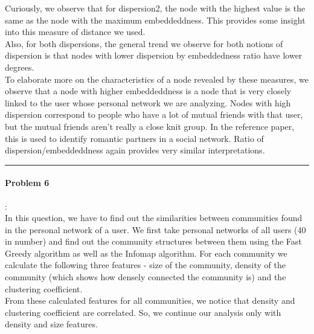 \documentclass{article}
\begin{document}
Curiously, we observe that for dispersion2, the node with the highest value is the same as the node with the maximum embeddeddness.
This provides some insight into this measure of distance we used.\\
Also, for both dispersions, the general trend we observe for both notions of dispersion 
is that nodes with lower dispersion by
embeddedness ratio have lower degrees.\\

To elaborate more on the characteristics of a node revealed by these measures, we observe that a node with higher
embeddeddness is a node that is very closely linked to the user whose personal network we are analyzing.
Nodes with high dispersion correspond to people who have a lot of mutual friends with that user, but the mutual friends
aren't really a close knit group. In the reference paper, this is used to identify romantic partners in a social network.
Ratio of dispersion/embeddeddness again provides very similar interpretations.

\hrule

\paragraph{Problem 6}:\\
In this question, we have to find out the similarities between communities found in the personal network of a user.
We first take personal networks of all users (40 in number) and find out the community structures between 
them using the Fast Greedy algorithm as well as the Infomap algorithm. For each community we 
calculate the following three features - size of the community, density of the community (which 
shows how densely connected the community is) and the clustering coefficient.\\

From these calculated features for all communities, we notice that density and clustering coefficient 
are correlated. So, we continue our analysis only with density and size features.\\
\end{document}
